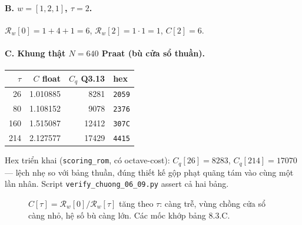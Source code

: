 \paragraph{B. $w=[1,2,1]$, $\tau=2$.}
$\mathcal{R}_w[0] = 1+4+1 = 6$, $\mathcal{R}_w[2] = 1\cdot 1 = 1$, $C[2] = 6$.

\paragraph{C. Khung thật $N=640$ Praat (bù cửa sổ thuần).}
\begin{center}\small
\begin{tabular}{@{}rrrl@{}}\toprule
$\tau$ & $C$ float & $C_q$ Q3.13 & hex \\
\midrule
26 & 1.010885 & 8281 & \texttt{2059} \\
80 & 1.108152 & 9078 & \texttt{2376} \\
160 & 1.515087 & 12412 & \texttt{307C} \\
214 & 2.127577 & 17429 & \texttt{4415} \\
\bottomrule
\end{tabular}
\end{center}
Hex triển khai (\texttt{scoring\_rom}, có octave-cost): $C_q[26] = 8283$, $C_q[214] = 17070$ --- lệch nhẹ so với bảng thuần, đúng thiết kế gộp phạt quãng tám vào cùng một lần nhân. Script \texttt{verify\_chuong\_06\_09.py} assert cả hai bảng.

\begin{figure}[H]
\centering
{}
\caption{$C[\tau]=\mathcal{R}_w[0]/\mathcal{R}_w[\tau]$ tăng theo $\tau$: càng trễ, vùng chồng cửa sổ càng nhỏ, hệ số bù càng lớn. Các mốc khớp bảng 8.3.C.}
\label{fig:ch08_C_growth}
\end{figure}

